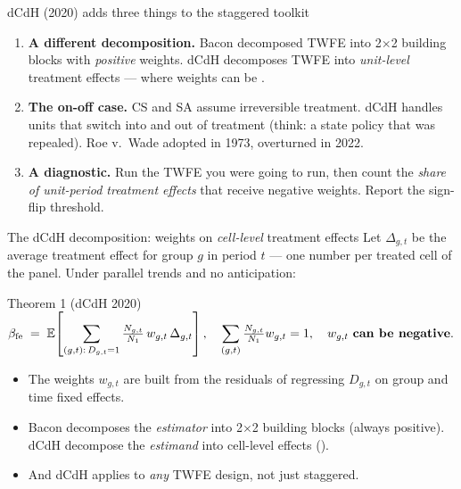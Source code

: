 \documentclass[aspectratio=169,11pt]{beamer}
\begin{document}
\begin{frame}{dCdH (2020) adds three things to the staggered toolkit}
\vspace{0.5em}
\begin{enumerate}\small
  \item \textbf{A different decomposition.} \;Bacon decomposed TWFE into 2$\times$2 building blocks with \textit{positive} weights. \;dCdH decomposes TWFE into \textit{unit-level} treatment effects --- where weights can be .
  \vspace{0.3em}
  \item \textbf{The on-off case.} \;CS and SA assume irreversible treatment. \;dCdH handles units that switch into and out of treatment (think: a state policy that was repealed). Roe v.\ Wade adopted in 1973, overturned in 2022.
  \vspace{0.3em}
  \item \textbf{A diagnostic.} \;Run the TWFE you were going to run, then count the \textit{share of unit-period treatment effects} that receive negative weights. Report the sign-flip threshold.
\end{enumerate}
\end{frame}

\begin{frame}{The dCdH decomposition: weights on \textit{cell-level} treatment effects}
\vspace{0.4em}
Let $\Delta_{g,t}$ be the average treatment effect for group $g$ in period $t$ --- one number per treated cell of the panel. \;Under parallel trends and no anticipation:
\vspace{0.3em}
\begin{block}{Theorem 1 (dCdH 2020)}
\centering
$\beta_{\text{fe}} \;=\; \mathbb{E}\!\left[\displaystyle\sum_{(g,t):\,D_{g,t}=1} \tfrac{N_{g,t}}{N_1}\, w_{g,t}\, \Delta_{g,t}\right], \quad \displaystyle\sum_{(g,t)}\tfrac{N_{g,t}}{N_1}w_{g,t} = 1, \quad w_{g,t} \text{ \textbf{can be negative}}.$
\end{block}
\vspace{0.4em}
\begin{itemize}\small
  \item The weights $w_{g,t}$ are built from the residuals of regressing $D_{g,t}$ on group and time fixed effects.
  \item Bacon decomposes the \textit{estimator} into 2$\times$2 building blocks (always positive). \;dCdH decompose the \textit{estimand} into cell-level effects ().
  \item And dCdH applies to \textit{any} TWFE design, not just staggered.
\end{itemize}
\end{frame}
\end{document}
